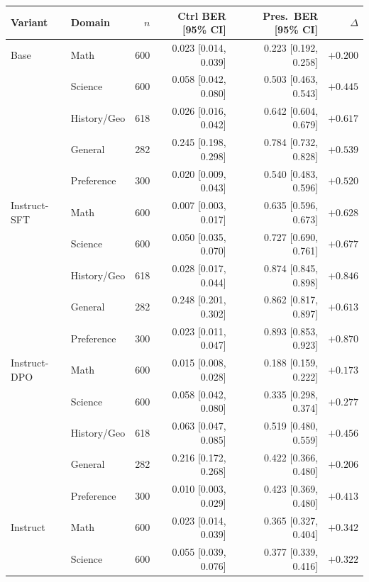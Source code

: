 \documentclass[11pt]{article}
\begin{document}
\begin{table}[H]
    \centering
    \scriptsize
    \setlength{\tabcolsep}{3pt}
    \renewcommand{\arraystretch}{1.0}
    \begin{tabular}{l l r r r r}
        \toprule
        Variant & Domain & $n$ & Ctrl BER [95\% CI] & Pres.\ BER [95\% CI] & $\Delta$ \\
        \midrule
        Base & Math & 600 & 0.023 [0.014, 0.039] & 0.223 [0.192, 0.258] & $+0.200$ \\
         & Science & 600 & 0.058 [0.042, 0.080] & 0.503 [0.463, 0.543] & $+0.445$ \\
         & History/Geo & 618 & 0.026 [0.016, 0.042] & 0.642 [0.604, 0.679] & $+0.617$ \\
         & General & 282 & 0.245 [0.198, 0.298] & 0.784 [0.732, 0.828] & $+0.539$ \\
         & Preference & 300 & 0.020 [0.009, 0.043] & 0.540 [0.483, 0.596] & $+0.520$ \\
        \midrule
        Instruct-SFT & Math & 600 & 0.007 [0.003, 0.017] & 0.635 [0.596, 0.673] & $+0.628$ \\
         & Science & 600 & 0.050 [0.035, 0.070] & 0.727 [0.690, 0.761] & $+0.677$ \\
         & History/Geo & 618 & 0.028 [0.017, 0.044] & 0.874 [0.845, 0.898] & $+0.846$ \\
         & General & 282 & 0.248 [0.201, 0.302] & 0.862 [0.817, 0.897] & $+0.613$ \\
         & Preference & 300 & 0.023 [0.011, 0.047] & 0.893 [0.853, 0.923] & $+0.870$ \\
        \midrule
        Instruct-DPO & Math & 600 & 0.015 [0.008, 0.028] & 0.188 [0.159, 0.222] & $+0.173$ \\
         & Science & 600 & 0.058 [0.042, 0.080] & 0.335 [0.298, 0.374] & $+0.277$ \\
         & History/Geo & 618 & 0.063 [0.047, 0.085] & 0.519 [0.480, 0.559] & $+0.456$ \\
         & General & 282 & 0.216 [0.172, 0.268] & 0.422 [0.366, 0.480] & $+0.206$ \\
         & Preference & 300 & 0.010 [0.003, 0.029] & 0.423 [0.369, 0.480] & $+0.413$ \\
        \midrule
        Instruct & Math & 600 & 0.023 [0.014, 0.039] & 0.365 [0.327, 0.404] & $+0.342$ \\
         & Science & 600 & 0.055 [0.039, 0.076] & 0.377 [0.339, 0.416] & $+0.322$ \\

\end{tabular}
\end{table}
\end{document}
